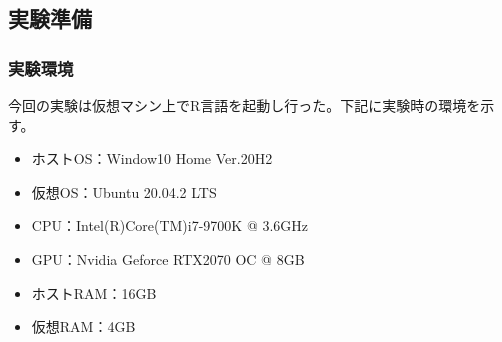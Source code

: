 \documentclass[dvipdfmx]{jsarticle}
\begin{document}
\subsection{実験準備}
  \subsubsection{実験環境}
  今回の実験は仮想マシン上でR言語を起動し行った。下記に実験時の環境を示す。
    \begin{itemize}
      \item ホストOS：Window10 Home Ver.20H2
      \item 仮想OS：Ubuntu 20.04.2 LTS
      \item CPU：Intel(R)Core(TM)i7-9700K @ 3.6GHz
      \item GPU：Nvidia Geforce RTX2070 OC @ 8GB
      \item ホストRAM：16GB
      \item 仮想RAM：4GB
    \end{itemize}
\end{document}
